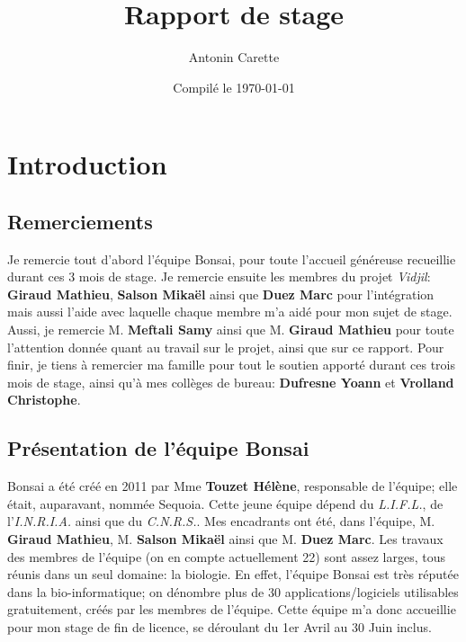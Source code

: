 \documentclass{report}
\title{Rapport de stage}
\author{Antonin Carette}
\date{Compilé le \today}
\begin{document}
\maketitle

\tableofcontents


\chapter{Introduction}

\section{Remerciements}
Je remercie tout d'abord l'équipe Bonsai, pour toute l'accueil généreuse recueillie durant ces 3 mois de stage.
\newline 
Je remercie ensuite les membres du projet \textit{Vidjil}: \textbf{Giraud Mathieu}, \textbf{Salson Mikaël} ainsi que \textbf{Duez Marc} pour l'intégration mais aussi l'aide avec laquelle chaque membre m'a aidé pour mon sujet de stage.
\newline
Aussi, je remercie M. \textbf{Meftali Samy} ainsi que M. \textbf{Giraud Mathieu} pour toute l'attention donnée quant au travail sur le projet, ainsi que sur ce rapport.
\newline
Pour finir, je tiens à remercier ma famille pour tout le soutien apporté durant ces trois mois de stage, ainsi qu'à mes collèges de bureau: \textbf{Dufresne Yoann} et \textbf{Vrolland Christophe}.

\section{Présentation de l'équipe Bonsai}
Bonsai a été créé en 2011 par Mme \textbf{Touzet Hélène}, responsable de l'équipe; elle était, auparavant, nommée Sequoia.
\newline
Cette jeune équipe dépend du \textit{L.I.F.L.}, de l'\textit{I.N.R.I.A.} ainsi que du \textit{C.N.R.S.}.
\newline
Mes encadrants ont été, dans l'équipe, M. \textbf{Giraud Mathieu}, M. \textbf{Salson Mikaël} ainsi que M. \textbf{Duez Marc}.
\newline
Les travaux des membres de l'équipe (on en compte actuellement 22) sont assez larges, tous réunis dans un seul domaine: la biologie.
\newline
En effet, l'équipe Bonsai est très réputée dans la bio-informatique; on dénombre plus de 30 applications/logiciels utilisables gratuitement, créés par les membres de l'équipe.
\newline
Cette équipe m'a donc accueillie pour mon stage de fin de licence, se déroulant du 1er Avril au 30 Juin inclus.
\end{document}
